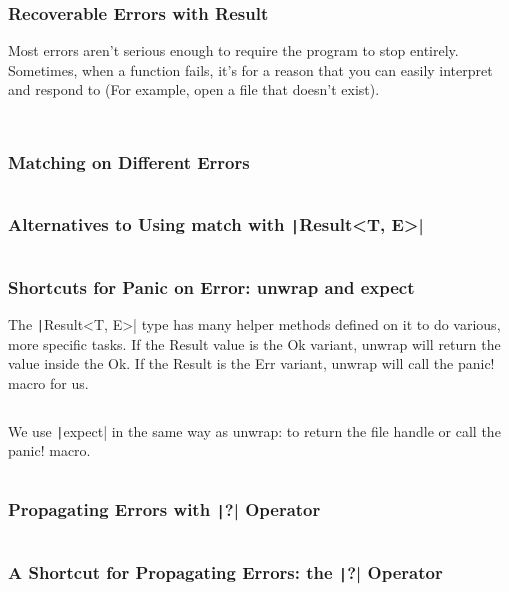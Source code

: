 \documentclass{beamer}
\begin{document}
\begin{frame}[fragile]
	\frametitle{Recoverable Errors with Result}
	Most errors aren’t serious enough to require the program to stop entirely. Sometimes, when a function fails, it’s for a reason that you can easily interpret and respond to (For example, open a file that doesn’t exist).
	
	\scriptsize
	
	\inputminted[fontsize=\scriptsize]{rust}{./code/result.rs}
	
	\inputminted[fontsize=\scriptsize]{rust}{./code/result2.rs}
\end{frame}


\begin{frame}[fragile]
	\frametitle{Matching on Different Errors}

	\inputminted[fontsize=\scriptsize]{rust}{./code/result3.rs}
\end{frame}


\begin{frame}[fragile]
	\frametitle{Alternatives to Using match with \texttt|Result<T, E>| }
	
	\inputminted[fontsize=\scriptsize]{rust}{./code/result4.rs}
\end{frame}

\begin{frame}[fragile]
	\frametitle{Shortcuts for Panic on Error: unwrap and expect }
	\scriptsize
   The \texttt|Result<T, E>| type has many helper methods defined on it to do various, more specific tasks. If the Result value is the Ok variant, unwrap will return the value inside the Ok. If the Result is the Err variant, unwrap will call the panic! macro for us.
   
	\inputminted[fontsize=\scriptsize]{rust}{./code/result5.rs}
	
	We use  \texttt|expect| in the same way as unwrap: to return the file handle or call the panic! macro.
	
	\inputminted[fontsize=\scriptsize]{rust}{./code/result6.rs}
\end{frame}



\begin{frame}[fragile]
	\frametitle{Propagating Errors with  \texttt|?| Operator}
	\inputminted{rust}{./code/result8.rs}
\end{frame}

\begin{frame}[fragile]
	\frametitle{A Shortcut for Propagating Errors: the \texttt|?| Operator}
	\inputminted{rust}{./code/result7.rs}
\end{frame}
\end{document}
